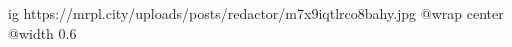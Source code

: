  
 
 
 
 

\ifcmt
  ig https://mrpl.city/uploads/posts/redactor/m7x9iqtlrco8bahy.jpg
  @wrap center
  @width 0.6
\fi
